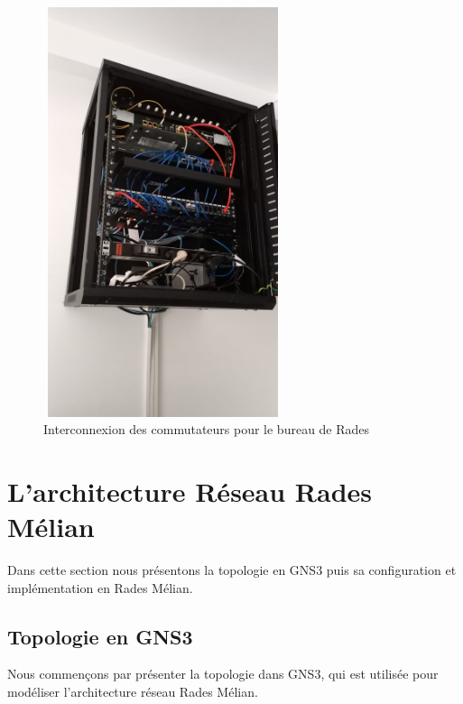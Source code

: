 \begin{figure}[H]
\centering
\includegraphics[width=7cm,height=12cm]{Images/BRades-ArmoirePrincipal.jpg}
\caption{Interconnexion des commutateurs pour le bureau de Rades}
\label{Chap2.2.11}
\end{figure}

\section{L'architecture Réseau Rades Mélian}

Dans cette section nous présentons la topologie en GNS3 puis sa configuration et implémentation en Rades Mélian.


\subsection{Topologie en GNS3}

Nous commençons par présenter la topologie dans GNS3, qui est utilisée pour modéliser l'architecture réseau Rades Mélian.  \\

